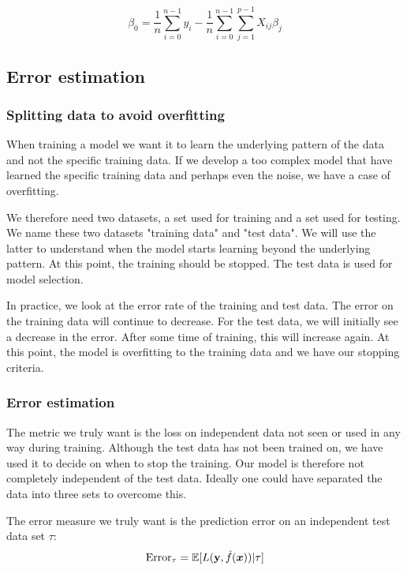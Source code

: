 \begin{equation}\label{bet0}
    \beta_0 = \frac{1}{n}\sum_{i=0}^{n-1}y_i - \frac{1}{n}\sum_{i=0}^{n-1}\sum_{j=1}^{p-1}X_{ij}\beta_j
\end{equation}

\subsection{Error estimation}

\subsubsection{Splitting data to avoid overfitting}\label{overfitting}

When training a model we want it to learn the underlying pattern of the data and not the specific training data. If we develop a too complex model that have learned the specific training data and perhaps even the noise, we have a case of overfitting. 

We therefore need two datasets, a set used for training and a set used for testing. We name these two datasets "training data" and "test data". 
We will use the latter to understand when the model starts learning beyond the underlying pattern. At this point, the training should be stopped. The test data is used for model selection.

In practice, we look at the error rate of the training and test data. The error on the training data will continue to decrease. For the test data, we will initially see a decrease in the error. After some time of training, this will increase again. At this point, the model is overfitting to the training data and we have our stopping criteria.


\subsubsection{Error estimation}

The metric we truly want is the loss on independent data not seen or used in any way during training. Although the test data has not been trained on, we have used it to decide on when to stop the training. Our model is therefore not completely independent of the test data. Ideally one could have separated the data into three sets to overcome this. 

The error measure we truly want is the prediction error on an independent test data set $\tau$: 
\begin{equation}\label{error_test}
    \text{Error}_{\tau} = \mathbb{E}[L(\mathbf{y},\hat{f}(\boldsymbol{x})) | \tau]
\end{equation}

